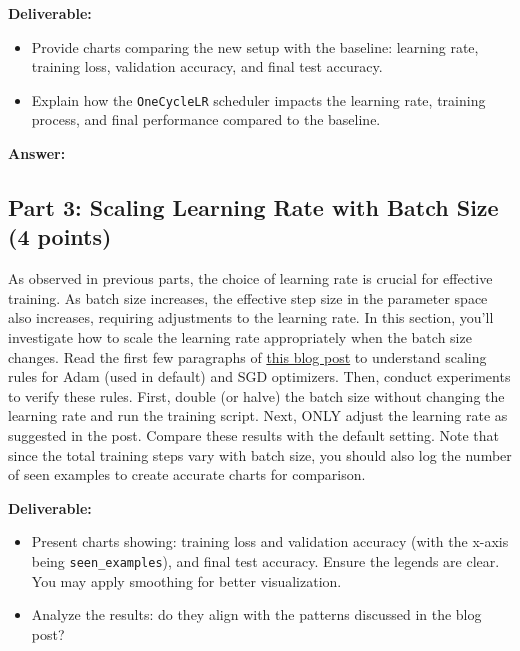 \documentclass[11pt, oneside]{article}   	%
\begin{document}
\noindent\textbf{Deliverable:}
\begin{itemize}
    \item Provide charts comparing the new setup with the baseline: learning rate, training loss, validation accuracy, and final test accuracy.
    \item Explain how the \texttt{OneCycleLR} scheduler impacts the learning rate, training process, and final performance compared to the baseline.
\end{itemize}

\begin{answerbox} \textbf{Answer:} \vspace*{1cm}

\end{answerbox}



\subsection*{Part 3: Scaling Learning Rate with Batch Size (4 points)}

As observed in previous parts, the choice of learning rate is crucial for effective training. As batch size increases, the effective step size in the parameter space also increases, requiring adjustments to the learning rate. In this section, you'll investigate how to scale the learning rate appropriately when the batch size changes. Read the first few paragraphs of \href{https://www.cs.princeton.edu/~smalladi/blog/2024/01/22/SDEs-ScalingRules/}{this blog post} to understand scaling rules for Adam (used in default) and SGD optimizers. Then, conduct experiments to verify these rules. First, double (or halve) the batch size without changing the learning rate and run the training script. Next, ONLY adjust the learning rate as suggested in the post. Compare these results with the default setting. Note that since the total training steps vary with batch size, you should also log the number of seen examples to create accurate charts for comparison.


\noindent\textbf{Deliverable:}
\begin{itemize}
    \item Present charts showing: training loss and validation accuracy (with the x-axis being \texttt{seen\_examples}), and final test accuracy. Ensure the legends are clear. You may apply smoothing for better visualization. 
    \item Analyze the results: do they align with the patterns discussed in the blog post?
\end{itemize}
\end{document}
